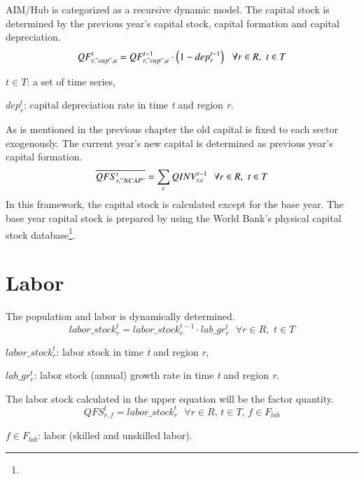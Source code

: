 \documentclass[10pt,a4paper,titlepage,dvipdfmx]{book}
\begin{document}
AIM/Hub is categorized as a recursive dynamic model. The capital stock is determined by the previous year's capital stock, capital formation and capital depreciation.
\begin{equation}
\label{equ:capstok}
QF_{r,"cap",a}^{t}=QF_{r,"cap",a}^{t-1}\cdot \left(1-dep_{r}^{t-1}\right)\,\,\,\,\forall r\in R,\,\,t\in T
\end{equation}

\begin{center}$t\in T$: a set of time series,
\end{center}

\begin{flushleft} $dep_{r}^{t}$: capital depreciation rate in time \textit{t} and region \textit{r}. \end{flushleft}

As is mentioned in the previous chapter the old capital is fixed to each sector exogenously. The current year's new capital is determined as previous year's capital formation.
\begin{equation}
\label{equ:capstokInv}
\overline{QFS_{r,"NCAP"}^{t}}=\sum _{c}QINV_{r,c}^{t-1}\,\,\,\,\forall r\in R,\,\,t\in T
\end{equation}
In this framework, the capital stock is calculated except for the base year. The base year capital stock is prepared by using the World Bank's physical capital stock database\footnote{}.

\section{\label{sec:Lab}Labor}

The population and labor is dynamically determined. 
\begin{equation}
\label{equ:LabSto}
labor\_ stock_{r}^{t}=labor\_ stock_{r}^{t-1}\cdot lab\_ gr_{r}^{t}\,\,\,\,\forall r\in R,\,\,t\in T
\end{equation}
\begin{flushleft}
$labor\_ stock_{r}^{t}$: labor stock in time \textit{t} and region \textit{r},

$lab\_ gr_{r}^{t}$: labor stock (annual) growth rate in time \textit{t} and region \textit{r}.
\end{flushleft}

The labor stock calculated in the upper equation will be the factor quantity. 
\begin{equation}
\label{equ:QFS}
QFS_{r,f}^{t}=labor\_ stock_{r}^{t}\,\,\,\,\forall r\in R,\,t\in T,\,f\in F_{lab}
\end{equation}
\begin{flushleft} $f\in F_{lab}$: labor (skilled and unskilled labor). \end{flushleft}
\end{document}
